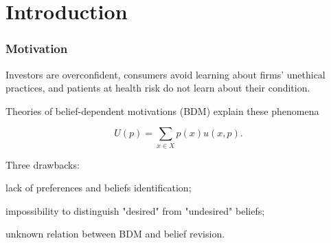 \documentclass[usenames,dvipsnames,aspectratio=169,11pt, envcountsect]{beamer}
\begin{document}
\section{Introduction}

\begin{frame}
	\maketitle

\end{frame}

\begin{frame}\frametitle{Motivation}

	Investors are overconfident, consumers avoid learning about firms' unethical practices, and patients at health risk do not learn about their condition.

	\vfill

	Theories of belief-dependent motivations (BDM) explain these phenomena

	\[
		U \left( p \right) = \sum_{x \in X} p \left( x \right) u \left( x, p \right) .
	\] \pause

	\vfill

	Three drawbacks:

	\vfill

	\begin{wideitemize}
		\item lack of preferences and beliefs identification;
		\item impossibility to distinguish "desired" from "undesired" beliefs;
		\item unknown relation between BDM and belief revision.
	\end{wideitemize}


\end{frame}
\end{document}
